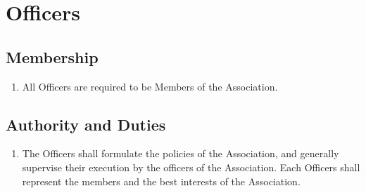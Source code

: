 \section{Officers}

\subsection{Membership}
\begin{enumerate}
	\item All Officers are required to be Members of the Association.
\end{enumerate}

\subsection{Authority and Duties}
\begin{enumerate}
	\item The Officers shall formulate the policies of the Association, and generally supervise their execution by the officers of the Association. Each Officers shall represent the members and the best interests of the Association.
\end{enumerate}

